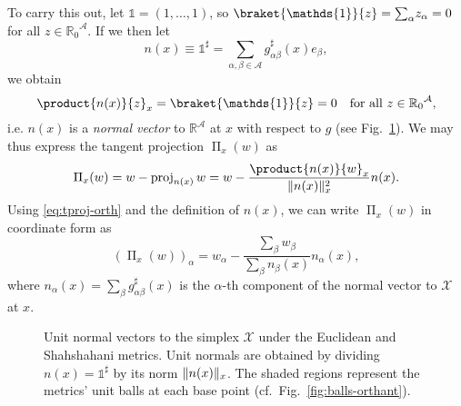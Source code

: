 \documentclass[reqno]{amsart}
\DeclarePairedDelimiter{\norm}{\lVert}{\rVert}
\theoremstyle{plain}
\theoremstyle{definition}
\theoremstyle{remark}
\numberwithin{equation}{section}
\numberwithin{theorem}{section}
\begin{document}
To carry this out, let ${\mathds{1}} = (1,\dotsc,1)$, so $\braket{\mathds{1}}{z} = {\sum\nolimits}_{\alpha} z_{\alpha} = 0$ for all $z\in{{\mathbb{R}}_{0}}^{\mathcal{A}}$.
If we then let
\begin{equation}
\label{eq:normal}
{n}(x)
	\equiv {\mathds{1}}^{\sharp}
	= \sum_{\alpha,\beta\in{\mathcal{A}}} g_{\alpha\beta}^{\sharp}(x) {e}_{\beta},
\end{equation}
we obtain
\begin{equation}
\product{{n}(x)}{z}_{x}
	= \braket{\mathds{1}}{z}
	= 0
	\quad
	\text{for all $z\in{{\mathbb{R}}_{0}}^{\mathcal{A}}$},
\end{equation}
i.e. ${n}(x)$ is a \emph{normal vector} to ${\mathbb{R}}^{\mathcal{A}}$ at $x$ with respect to $g$
(see Fig.~\ref{fig:normals}).
We may thus express the tangent projection $\operatorname{\Pi}_{x}(w)$ as
\begin{equation}
\label{eq:tproj-orth}
\operatorname{\Pi}_{x}(w)
	= w - \operatorname{proj}_{{n}(x)} w
	= w - \frac{\product{{n}(x)}{w}_{x}}{\norm{{n}(x)}_{x}^{2}} {n}(x).
\end{equation}
Using \eqref{eq:tproj-orth} and the definition of ${n}(x)$, we can write $\operatorname{\Pi}_{x}(w)$ in coordinate form as
\begin{equation}
\label{eq:tproj-coords}
\left( \operatorname{\Pi}_{x}(w) \right)_{\alpha}
	= w_{\alpha} - \frac{{\sum\nolimits}_{\beta} w_{\beta}}{{\sum\nolimits}_{\beta} {n}_{\beta}(x)} {n}_{\alpha}(x),
\end{equation}
where
${n}_{\alpha}(x)	
	=  {\sum\nolimits}_{\beta} g_{\alpha\beta}^{\sharp}(x)$
is the $\alpha$-th component of the normal vector 
to ${\mathcal{X}}$ at $x$.

\begin{figure}[t]
\hfill
{}\caption{\small
Unit normal vectors to the simplex ${\mathcal{X}}$ under the Euclidean and Shahshahani metrics.
Unit normals are obtained by dividing ${n}(x)={\mathds{1}}^{\sharp}$ by its norm $\norm{{n}(x)}_{x}$.
The shaded regions represent the metrics' unit balls at each base point (cf.~Fig.~\ref{fig:balls-orthant}).}
\label{fig:normals}
\end{figure}
\end{document}
